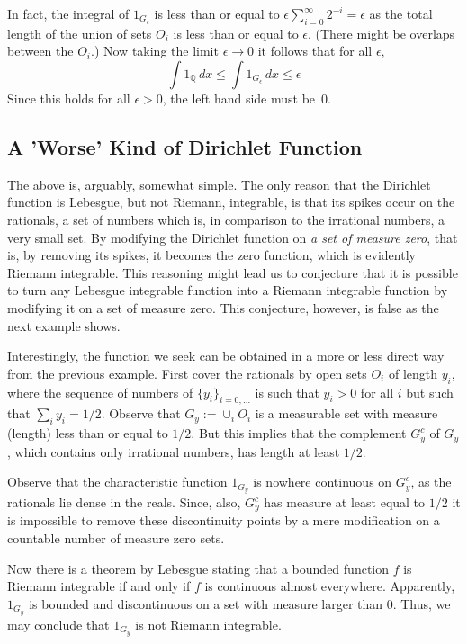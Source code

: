 \documentclass[12pt]{article}
\newcommand{\1}{{{\bf 1}}}
\begin{document}
In fact, the integral of $1_{G_\epsilon}$ is less than or equal to
$\epsilon\sum_{i=0}^\infty 2^{-i} = \epsilon$ as the total length of
the union of sets $O_i$ is less than or equal to $\epsilon$.  (There
might be overlaps between the $O_i$.) Now taking the limit
$\epsilon\to 0$ it follows that for all $\epsilon$,
\begin{equation*}
  \int 1_{\mathbb{Q}}\,dx \leq  \int
  1_{G_\epsilon} \, dx \leq \epsilon
\end{equation*}
Since this holds for all $\epsilon >0$, the left hand side must be~0.

\subsection*{A 'Worse' Kind of Dirichlet Function}

The above is, arguably, somewhat simple. The only reason that the
Dirichlet function is Lebesgue, but not Riemann, integrable, is that
its spikes occur on the rationals, a set of numbers which is, in
comparison to the irrational numbers, a very small set.  By modifying
the Dirichlet function on \emph{a set of measure zero}, that is, by
removing its spikes, it becomes the zero function, which is evidently
Riemann integrable.  This reasoning might lead us to conjecture that
it is possible to turn any Lebesgue integrable function into a Riemann
integrable function by modifying it on a set of measure zero. This
conjecture, however, is false as the next example shows.

Interestingly, the function we seek can be obtained in a more or less
direct way from the previous example. First cover the rationals by
open sets $O_i$ of length $y_i$, where the sequence of numbers of
$\{y_i\}_{i=0,\ldots}$ is such that $y_i>0$ for all $i$ but such that
$\sum_i y_i = 1/2$.  Observe that $G_y:=\cup_i O_i$ is a measurable
set with measure (length) less than or equal to $1/2$. But this
implies that the complement $G^c_y$ of $G_y$, which contains only
irrational numbers, has length at least $1/2$.

Observe that the characteristic function $1_{G_y}$ is
nowhere continuous on $G^c_y$, as the rationals lie dense in the
reals. Since, also, $G_y^c$  has measure at least equal
to $1/2$ it is impossible to remove these discontinuity points by a
mere modification on a countable number of measure zero sets. 

Now there is a theorem by Lebesgue stating that a bounded function $f$
is Riemann integrable if and only if $f$ is continuous almost
everywhere.  Apparently, $1_{G_y}$ is bounded and
discontinuous on a set with measure larger than $0$. Thus, we may
conclude that $1_{G_y}$ is not Riemann integrable.  
\end{document}
